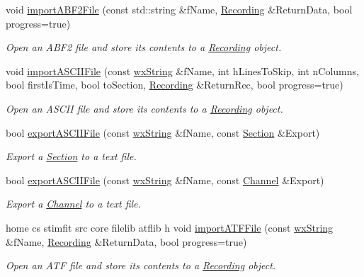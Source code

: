 \begin{DoxyCompactItemize}
void \hyperlink{namespacestf_af334ab7905de94c51ca488a735cdc83c}{importABF2File} (const std::string \&fName, \hyperlink{classRecording}{Recording} \&ReturnData, bool progress=true)
\begin{DoxyCompactList}\small\item\em Open an ABF2 file and store its contents to a \hyperlink{classRecording}{Recording} object. \item\end{DoxyCompactList}\item 
void \hyperlink{namespacestf_a3ea62b5c59c5cf64a74058afee5aeebf}{importASCIIFile} (const \hyperlink{classwxString}{wxString} \&fName, int hLinesToSkip, int nColumns, bool firstIsTime, bool toSection, \hyperlink{classRecording}{Recording} \&ReturnRec, bool progress=true)
\begin{DoxyCompactList}\small\item\em Open an ASCII file and store its contents to a \hyperlink{classRecording}{Recording} object. \item\end{DoxyCompactList}\item 
bool \hyperlink{namespacestf_a470b01a32ca1c8153db077d84a6aaedb}{exportASCIIFile} (const \hyperlink{classwxString}{wxString} \&fName, const \hyperlink{classSection}{Section} \&Export)
\begin{DoxyCompactList}\small\item\em Export a \hyperlink{classSection}{Section} to a text file. \item\end{DoxyCompactList}\item 
bool \hyperlink{namespacestf_a35952c89753b92b9939ba6a5607c78b3}{exportASCIIFile} (const \hyperlink{classwxString}{wxString} \&fName, const \hyperlink{classChannel}{Channel} \&Export)
\begin{DoxyCompactList}\small\item\em Export a \hyperlink{classChannel}{Channel} to a text file. \item\end{DoxyCompactList}\item 
home cs stimfit src core filelib atflib h void \hyperlink{namespacestf_aa7404900ed7ff18ca085190bbbd9a5fa}{importATFFile} (const \hyperlink{classwxString}{wxString} \&fName, \hyperlink{classRecording}{Recording} \&ReturnData, bool progress=true)
\begin{DoxyCompactList}\small\item\em Open an ATF file and store its contents to a \hyperlink{classRecording}{Recording} object. \item\end{DoxyCompactList}\item 

\end{DoxyCompactItemize}
